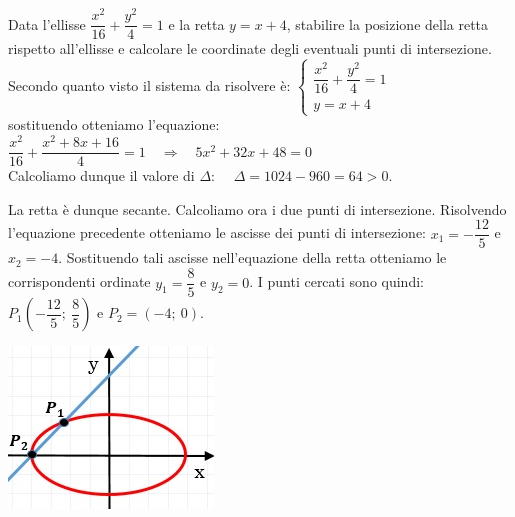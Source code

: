 \begin{esempio} Data l'ellisse \( \dfrac{x^{2}}{16}+  
\dfrac{y^{2}}{4} =1\) e la retta \(y=x+4\), stabilire la posizione della retta 
rispetto all'ellisse e calcolare le coordinate degli eventuali punti di intersezione.\\[7pt] 
Secondo quanto visto il sistema da risolvere è:
\(\begin{cases}  \dfrac{x^{2}}{16}+\dfrac{y^{2}}{4}=1   \\ y=x+4  
\end{cases}\) \\[4pt]
sostituendo otteniamo l'equazione: \( 
\dfrac{x^{2}}{16}+\dfrac{x^{2}+8x+16}{4}=1 \quad \Rightarrow \quad 5 
x^{2} +32x+48=0\)\\[7pt]
Calcoliamo dunque il valore di \(\Delta\): \(\quad \Delta =1024-960=64>0\). \\[7pt]
\begin{minipage}{.65\textwidth}
\noindent La retta è dunque secante. Calcoliamo ora i due punti di 
intersezione. Risolvendo l'equazione precedente otteniamo le ascisse dei punti di 
intersezione: \( x_{1} =- \dfrac{12}{5} \) e \( x_{2} =-4\). Sostituendo tali 
ascisse nell'equazione della retta otteniamo le corrispondenti ordinate \( 
y_{1} =\dfrac{8}{5}\) e \( y_{2} =0\). I punti cercati sono quindi: \( P_{1}  
\left(-\dfrac{12}{5};~ \dfrac{8}{5}\right) \) e \( P_{2} =(-4;~0)\).
\end{minipage}
\hspace{0.5cm}
\begin{minipage}{.35\textwidth}
  \includegraphics[width=\textwidth]{img/esempioposizione1.jpg}
\end{minipage}
\end{esempio}
 
